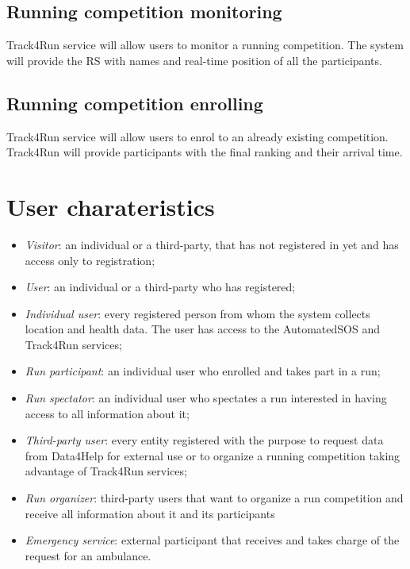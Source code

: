 \subsection{Running competition monitoring}
Track4Run service will allow users to monitor a running competition. The system will provide the RS with names and real-time position of all the participants.
\subsection{Running competition enrolling}
Track4Run service will allow users to enrol to an already existing competition. Track4Run will provide participants with the final ranking and their arrival time.

\section{User charateristics}
\begin{itemize}
\item	\textit{Visitor}: an individual or a third-party, that has not registered in yet and has access only to registration;
\item	\textit{User}:  an individual or a third-party who has registered;
\item	\textit{Individual user}: every registered person from whom the system collects location and health data. The user has access to the AutomatedSOS and Track4Run services;
\item	\textit{Run participant}: an individual user who enrolled and takes part in a run;
\item	\textit{Run spectator}: an individual user who spectates a run interested in having access to all information about it;
\item \textit{Third-party user}: every entity registered with the purpose to request data from Data4Help for external use or to organize a running competition taking advantage of Track4Run services;
\item	\textit{Run organizer}: third-party users that want to organize a run competition and receive all information about it and its participants
\item	\textit{Emergency service}: external participant that receives and takes charge of the request for an ambulance.
\end{itemize}

